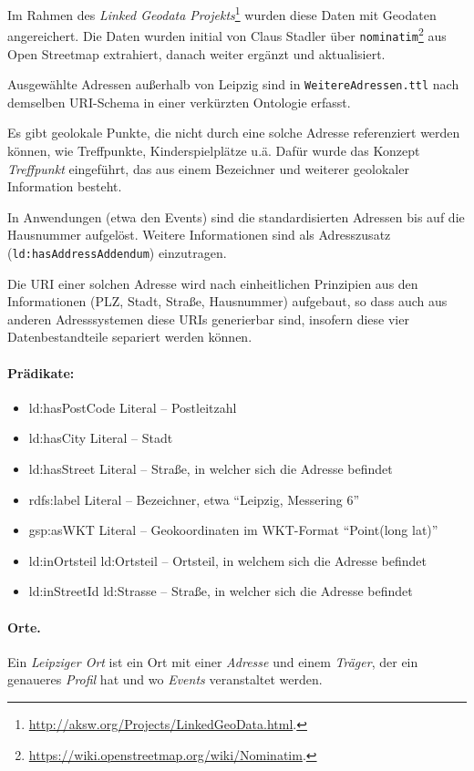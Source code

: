 \documentclass[a4paper,11pt]{article}
\begin{document}
Im Rahmen des \emph{Linked Geodata
  Projekts}\footnote{\url{http://aksw.org/Projects/LinkedGeoData.html}.}
wurden diese Daten mit Geodaten angereichert. Die Daten wurden initial von
Claus Stadler über
\texttt{nominatim}\footnote{\url{https://wiki.openstreetmap.org/wiki/Nominatim}.}
aus Open Streetmap extrahiert, danach weiter ergänzt und aktualisiert.

Ausgewählte Adressen außerhalb von Leipzig sind in
\texttt{WeitereAdressen.ttl} nach demselben URI-Schema in einer verkürzten
Ontologie erfasst.

Es gibt geolokale Punkte, die nicht durch eine solche Adresse referenziert
werden können, wie Treffpunkte, Kinderspielplätze u.ä. Dafür wurde das Konzept
\emph{Treffpunkt} eingeführt, das aus einem Bezeichner und weiterer geolokaler
Information besteht.

In Anwendungen (etwa den Events) sind die standardisierten Adressen bis auf
die Hausnummer aufgelöst. Weitere Informationen sind als Adresszusatz
(\texttt{ld:hasAddressAddendum}) einzutragen.

Die URI einer solchen Adresse wird nach einheitlichen Prinzipien aus den
Informationen (PLZ, Stadt, Straße, Hausnummer) aufgebaut, so dass auch aus
anderen Adresssystemen diese URIs generierbar sind, insofern diese vier
Datenbestandteile separiert werden können.

\paragraph{Prädikate:}
\begin{itemize}\itemsep0pt
\item ld:hasPostCode Literal – Postleitzahl
 \item ld:hasCity Literal – Stadt
\item ld:hasStreet Literal – Straße, in welcher sich die Adresse befindet
\item rdfs:label Literal – Bezeichner, etwa “Leipzig, Messering 6” 
\item gsp:asWKT Literal – Geokoordinaten im WKT-Format “Point(long lat)”
\item ld:inOrtsteil ld:Ortsteil – Ortsteil, in welchem sich die Adresse
  befindet
\item ld:inStreetId ld:Strasse – Straße, in welcher sich die Adresse befindet
\end{itemize}

\paragraph{Orte.} 
Ein \emph{Leipziger Ort} ist ein Ort mit einer \emph{Adresse} und einem
\emph{Träger}, der ein genaueres \emph{Profil} hat und wo \emph{Events}
veranstaltet werden.
\end{document}
